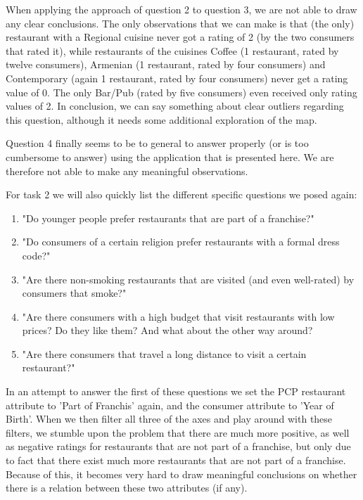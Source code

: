 When applying the approach of question 2 to question 3, we are not able to draw any clear conclusions. The only observations that we can make is that (the only) restaurant with a Regional cuisine never got a rating of 2 (by the two consumers that rated it), while restaurants of the cuisines Coffee (1 restaurant, rated by twelve consumers), Armenian (1 restaurant, rated by four consumers) and Contemporary (again 1 restaurant, rated by four consumers) never get a rating value of 0. The only Bar/Pub (rated by five consumers) even received only rating values of 2. In conclusion, we can say something about clear outliers regarding this question, although it needs some additional exploration of the map.

Question 4 finally seems to be to general to answer properly (or is too cumbersome to answer) using the application that is presented here. We are therefore not able to make any meaningful observations.

For task 2 we will also quickly list the different specific questions we posed again:
\begin{enumerate}
\setlength{\itemsep}{0cm}%
\setlength{\parskip}{0cm}%
\item "Do younger people prefer restaurants that are part of a franchise?"
\item "Do consumers of a certain religion prefer restaurants with a formal dress code?"
\item "Are there non-smoking restaurants that are visited (and even well-rated) by consumers that smoke?"
\item "Are there consumers with a high budget that visit restaurants with low prices? Do they like them? And what about the other way around?
\item "Are there consumers that travel a long distance to visit a certain restaurant?"
\end{enumerate}

In an attempt to answer the first of these questions we set the PCP restaurant attribute to 'Part of Franchis' again, and the consumer attribute to 'Year of Birth'. When we then filter all three of the axes and play around with these filters, we stumble upon the problem that there are much more positive, as well as negative ratings for restaurants that are not part of a franchise, but only due to fact that there exist much more restaurants that are not part of a franchise. Because of this, it becomes very hard to draw meaningful conclusions on whether there is a relation between these two attributes (if any).


